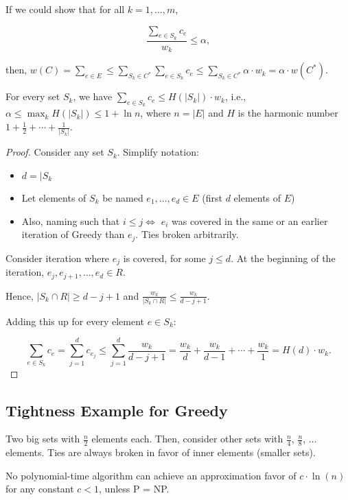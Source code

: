 If we could show that for all $k = 1, \ldots, m$,

$$\frac{\sum_{e \in S_k} c_e}{w_k} \le \alpha,$$

then, $w(C) = \sum\limits_{e \in E} \le \sum\limits_{S_k \in C^*} \sum\limits_{e \in S_k} c_e \le \sum\limits_{S_k \in C^*} \alpha \cdot w_k = \alpha \cdot w(C^*)$.

\begin{mytheorem}
For every set $S_k$, we have $\sum\limits_{e \in S_k} c_e \le H(|S_k|) \cdot w_k$, i.e., $\alpha \le \max_{k} H(|S_k|) \le 1 + \ln n$, where $n = |E|$ and $H$ is the harmonic number $1 + \frac{1}{2} + \cdots + \frac{1}{|S_k|}$.
\end{mytheorem}
\begin{proof}
Consider any set $S_k$. Simplify notation:
\begin{itemize}
\item $d = |S_k$
\item Let elements of $S_k$ be named $e_1, \ldots, e_d \in E$ (first $d$ elements of $E$)
\item Also, naming such that $i \le j \iff$ $e_i$ was covered in the same or an earlier iteration of Greedy than $e_j$. Ties broken arbitrarily.
\end{itemize}

Consider iteration where $e_j$ is covered, for some $j \le d$. At the beginning of the iteration, $e_j, e_{j+1}, \ldots, e_d \in R$.

Hence, $|S_k \cap R| \ge d -j+1$ and $\frac{w_k}{|S_k \cap R|} \le \frac{w_k}{d-j+1}$.

Adding this up for every element $e \in S_k$:

$$\sum\limits_{e \in S_k} c_e = \sum\limits_{j=1}^d c_{e_j} \le \sum\limits_{j=1}^d \frac{w_k}{d-j+1} = \frac{w_k}{d} + \frac{w_k}{d-1} + \cdots + \frac{w_k}{1} = H(d) \cdot w_k.$$
\end{proof}

\subsection{Tightness Example for Greedy}

Two big sets with $\frac{n}{2}$ elements each. Then, consider other sets with $\frac{n}{4}$, $\frac{n}{8}$, $\ldots$ elements. Ties are always broken in favor of inner elements (smaller sets).

\begin{mytheorem}
No polynomial-time algorithm can achieve an approximation favor of $c \cdot \ln (n)$ for any constant $c < 1$, unless P = NP.
\end{mytheorem}

